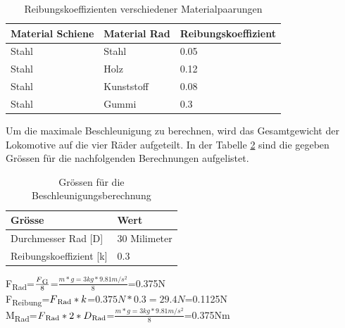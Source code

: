 \documentclass[../../main.tex]{subfiles}
\begin{document}
    \begin{table}[H] \centering
        \begin{tabular}{|l|l|l|}
        \hline
        \textbf{Material Schiene} & \textbf{Material Rad} & \textbf{Reibungskoeffizient}\\
        \hline
        Stahl                                & Stahl        & 0.05\\
        \hline
        Stahl                                & Holz         & 0.12\\
        \hline
        Stahl                                & Kunststoff   & 0.08\\
        \hline
        Stahl                                & Gummi        & 0.3\\
        \hline
        \end{tabular}

        \caption{Reibungskoeffizienten verschiedener Materialpaarungen}
        \label{tab:com_tiny_pi}
        \end{table}

    Um die maximale Beschleunigung zu berechnen, wird das Gesamtgewicht der Lokomotive auf die vier Räder aufgeteilt. In der Tabelle \ref{tab:groessen_beschleunigung} sind die gegeben Grössen für die nachfolgenden Berechnungen aufgelistet.\\

    \begin{table}[H] \centering
        \begin{tabular}{|l|l|}
        \hline
        \textbf{Grösse} & \textbf{Wert}\\
        \hline
        Durchmesser Rad [D]          & 30 Milimeter\\
         \hline
        Reibungskoeffizient [k]      & 0.3\\
        \hline
        \end{tabular}

        \caption{Grössen für die Beschleunigungsberechnung}
        \label{tab:groessen_beschleunigung}
        \end{table}

    F\textsubscript{Rad}=\(\frac{F\textsubscript{G}}{8}\)=\(\frac{m*g=3kg*9.81m/s^2}{8}\)=0.375N\\

    F\textsubscript{Reibung}=\(F\textsubscript{Rad}*k\)=\(0.375N*0.3=29.4N\)=0.1125N\\

    M\textsubscript{Rad}=\(F\textsubscript{Rad}*2*D\textsubscript{Rad}\)=\(\frac{m*g=3kg*9.81m/s^2}{8}\)=0.375Nm\\
\end{document}

